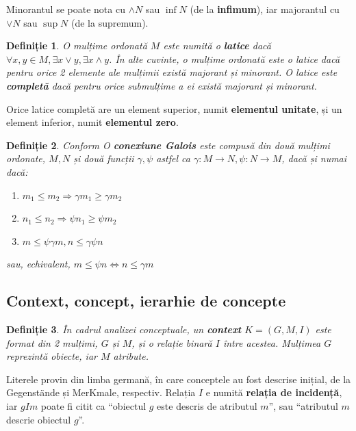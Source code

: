 \documentclass[12pt, a4paper, twoside, romanian]{teza-upb}
\newtheorem{defn}{Definiție}
\begin{document}
    Minorantul se poate nota cu $\wedge N$ sau $\inf N$ (de la \textbf{infimum}), iar majorantul cu $\vee N$ sau $\sup N$ (de la supremum).

    \begin{defn}
      O mulțime ordonată $M$ este numită o \textbf{latice} dacă $\forall x,y \in M, \exists x \vee y, \exists x \wedge y$. În alte cuvinte, o mulțime ordonată este o latice dacă pentru orice 2 elemente
      ale mulțimii există majorant și minorant. O latice este \textbf{completă} dacă pentru orice submulțime a ei există majorant și minorant.
    \end{defn}

    Orice latice completă are un element superior, numit \textbf{elementul unitate}, și un element inferior, numit \textbf{elementul zero}.

    \begin{defn}
      Conform \cite{Carpineto:2004:CDA:975252} O \textbf{conexiune Galois} este compusă din două mulțimi ordonate, $M, N$ și două funcții $\gamma, \psi$ astfel ca $ \gamma: M \rightarrow N, \psi : N \rightarrow M$, dacă și numai dacă:
    \begin{enumerate}
      \item $m_1 \le m_2 \Rightarrow  \gamma m_1 \ge \gamma m_2$
      \item $n_1 \le n_2 \Rightarrow \psi n_1 \ge \psi m_2$
      \item $m \le \psi \gamma m,  n \le \gamma\psi n $
    \end{enumerate}
    sau, echivalent, $m \le \psi n \Leftrightarrow n \le \gamma m$
    \end{defn}

    \subsection{Context, concept, ierarhie de concepte}
    \begin{defn}
      În cadrul analizei conceptuale, un \textbf{context} $K = (G, M, I)$ este format din 2 mulțimi, $G$ și $M$, și o relație binară $I$ între acestea. Mulțimea $G$ reprezintă obiecte, iar $M$ atribute.
    \end{defn}

      Literele provin din limba germană, în care conceptele au fost descrise inițial, de la Gegenstände și MerKmale, respectiv. Relația $I$ e numită \textbf{relația de incidență}, iar $gIm$ poate fi citit ca ``obiectul $g$ este descris de atributul $m$'', sau ``atributul $m$ descrie obiectul $g$''.
\end{document}
